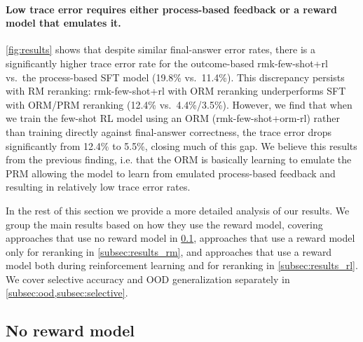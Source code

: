 \documentclass[11pt, a4paper, logo]{deepmind}
\newcommand{\Short}[1]{\csname rmk-#1\endcsname}
\begin{document}
\paragraph{Low trace error requires either process-based feedback or a reward model that emulates it.}
\cref{fig:results} shows that despite similar final-answer error rates, there is a significantly higher trace error rate for the outcome-based \Short{few-shot+rl} vs.\ the process-based SFT model (19.8\% vs.\ 11.4\%). This discrepancy persists with RM reranking: \Short{few-shot+rl} with ORM reranking underperforms SFT with ORM/PRM reranking (12.4\% vs.\ 4.4\%/3.5\%). However, we find that when we train the few-shot RL model using an ORM (\Short{few-shot+orm-rl}) rather than training directly against final-answer correctness, the trace error drops significantly from 12.4\% to 5.5\%, closing much of this gap.  We believe this results from the previous finding, i.e. that the ORM is basically learning to emulate the PRM allowing the model to learn from emulated process-based feedback and resulting in relatively low trace error rates.



In the rest of this section we provide a more detailed analysis of our results.  We group the main results based on how they use the reward model, covering approaches that use no reward model in \cref{subsec:policy_only}, approaches that use a reward model only for reranking in \cref{subsec:results_rm}, and approaches that use a reward model both during reinforcement learning and for reranking in \cref{subsec:results_rl}.
We cover selective accuracy and OOD generalization separately in \cref{subsec:ood,subsec:selective}.



\subsection{No reward model}
\label{subsec:policy_only}
\end{document}
